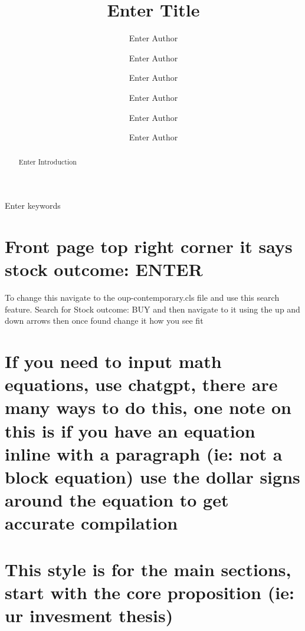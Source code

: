 \documentclass[a4paper,num-refs]{oup-contemporary}
\title{Enter Title}
\author[1]{Enter Author}
\author[2]{Enter Author}
\author[3]{Enter Author}
\author[4]{Enter Author}
\author[5]{Enter Author}
\author[6]{Enter Author}
\affil[*]{\textbf{Target Price}: \textbf{Enter target price if possible} \\
\textbf{Investment Horizon}: Enter investment horizon}
\begin{document}
\begin{frontmatter}

\maketitle

\begin{abstract}

Enter Introduction

\end{abstract}

\begin{keywords}

Enter keywords

\end{keywords}


\end{frontmatter}


\section{Front page top right corner it says stock outcome: ENTER}

To change this navigate to the oup-contemporary.cls file and use this search feature. Search for Stock outcome: BUY and then navigate to it using the up and down arrows then once found change it how you see fit


\section{If you need to input math equations, use chatgpt, there are many ways to do this, one note on this is if you have an equation inline with a paragraph (ie: not a block equation) use the dollar signs around the equation to get accurate compilation}


\section*{This style is for the main sections, start with the core proposition (ie: ur invesment thesis)}
\end{document}
